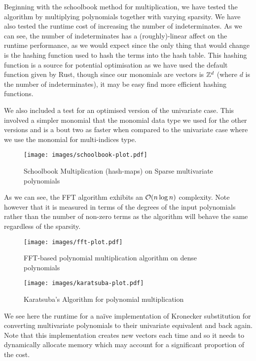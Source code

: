 Beginning with the schoolbook method for multiplication, we have tested the algorithm by multiplying polynomials together with varying sparsity. We have also tested the runtime cost of increasing the number of indeterminates. As we can see, the number of indeterminates has a (roughly)-linear affect on the runtime performance, as we would expect since the only thing that would change is the hashing function used to hash the terms into the hash table. This hashing function is a source for potential optimisation as we have used the default function given by Rust, though since our monomials are vectors is ${\mathbb Z}^d$ (where $d$ is the number of indeterminates), it may be easy find more efficient hashing functions.

We also included a test for an optimised version of the univariate case. This involved a simpler monomial that the monomial data type we used for the other versions and is a bout two as faster when compared to the univariate case where we use the monomial for multi-indices type.

\begin{figure}[t]
    \centering
    \texttt{[image: images/schoolbook-plot.pdf]}
    \caption{Schoolbook Multiplication (hash-maps) on Sparse multivariate polynomials}
    \label{fig:schoolbook}
\end{figure}


As we can see, the FFT algorithm exhibits an $\mathcal O(n \log n)$ complexity. Note however that it is measured in terms of the degrees of the input polynomials rather than the number of non-zero terms as the algorithm will behave the same regardless of the sparsity.

\begin{figure}[t]
    \centering
    \texttt{[image: images/fft-plot.pdf]}
    \caption{FFT-based polynomial multiplication algorithm on dense polynomials}
    \label{fig:fft}
\end{figure}

\begin{figure}[t]
    \centering
    \texttt{[image: images/karatsuba-plot.pdf]}
    \caption{Karatsuba's Algorithm for polynomial multiplication}
    \label{fig:karatsuba}
\end{figure}


We see here the runtime for a na\"{i}ve implementation of Kronecker substitution for converting multivariate polynomials to their univariate equivalent and back again. Note that this implementation creates new vectors each time and so it needs to dynamically allocate memory which may account for a significant proportion of the cost.

